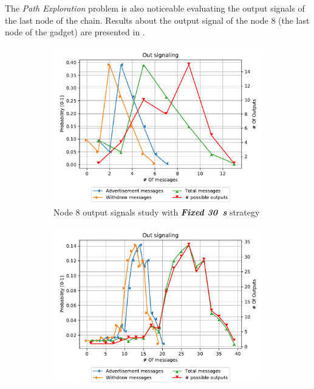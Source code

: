 The \textit{Path Exploration} problem is also noticeable evaluating the
output signals of the last node of the chain.
Results about the output signal of the node \num{8} (the last node of the gadget)
are presented in .

\begin{figure}[ht]
     \centering
     \begin{subfigure}[b]{0.49\textwidth}
         \centering
         \includegraphics[width=\textwidth]{images/signal_study/fabrikant/30Fixed.pdf}
		 \caption{Node \num{8} output signals study with \textbf{\textit{Fixed \SI{30}{\second}}} strategy}
         \label{fig:signal_node9_fabrikant_fixed30_noIW}
     \end{subfigure}
     \hfill
     \begin{subfigure}[b]{0.49\textwidth}
         \centering
         \includegraphics[width=\textwidth]{images/signal_study/fabrikant/Descendent.pdf}

\end{subfigure}
\end{figure}
